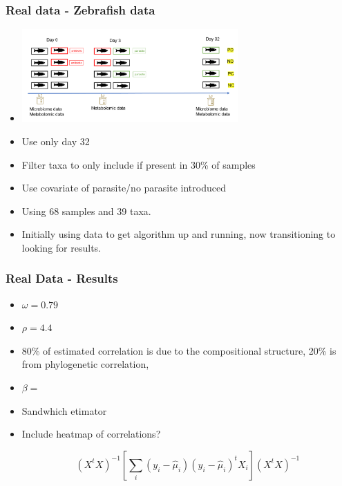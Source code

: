 \documentclass{beamer}
\begin{document}
\begin{frame}
\frametitle{Real data - Zebrafish data}
\begin{itemize}
  \item
	\includegraphics[width=0.65\textwidth]{img/2022_April_11_Research_Update-f2887a67.png}
  \item Use only day 32
  \item Filter taxa to only include if present in 30\% of samples
  \item Use covariate of parasite/no parasite introduced
  \item Using 68 samples and 39 taxa.
  \item Initially using data to get algorithm up and running, now transitioning to looking for results.
\end{itemize}
\end{frame}
\begin{frame}
\frametitle{Real Data - Results}
\begin{itemize}
  \item $\omega  = 0.79$
  \item $\rho = 4.4$
  \item 80\% of estimated correlation is due to the compositional structure, 20\% is from phylogenetic correlation,
  \item $\beta = $
  \item Sandwhich etimator
  \item Include heatmap of correlations?

  \[ (X^tX)^{-1} [\sum_i(y_i - \hat\mu_i)(y_i - \hat\mu_i)^tX_i](X^tX)^{-1}\]
\end{itemize}
\end{frame}
\end{document}

